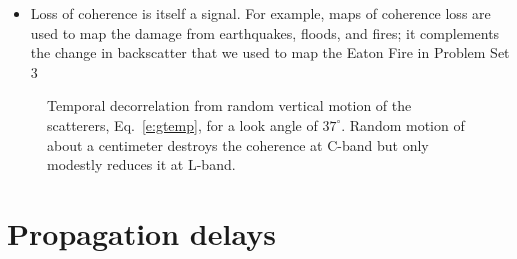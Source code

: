 \documentclass[11pt, oneside]{article}
\begin{document}
\begin{itemize}
\begin{itemize}
		\item Wind-blown sand: in a C-band interferogram of the Algodones Dunefield (California), active, unvegetated dunes stayed correlated over one day but decorrelated completely over five months, while partially vegetated dunes stayed correlated (Rosen et al., 2000, p.~351 and Fig.~23)
		\item Disturbance: fire, flooding, landslides, construction, and earthquake ruptures rearrange the scatterers
	\end{itemize}
	\item[$\Rightarrow$] Loss of coherence is itself a signal. For example, maps of coherence loss are used to map the damage from earthquakes, floods, and fires; it complements the change in backscatter that we used to map the Eaton Fire in Problem Set 3
\end{itemize}

\begin{figure}[!htbp]
	\centering
	\caption{Temporal decorrelation from random vertical motion of the scatterers, Eq.~\eqref{e:gtemp}, for a look angle of $37^\circ$. Random motion of about a centimeter destroys the coherence at C-band but only modestly reduces it at L-band.}
	\label{f:gtemp}
\end{figure}

\section{Propagation delays}
\label{s:delay}
\end{document}
